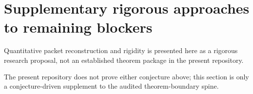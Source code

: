 \section*{Supplementary rigorous approaches to remaining blockers}
Quantitative packet reconstruction and rigidity is presented here as a rigorous research proposal, not an established theorem package in the present repository.

The present repository does not prove either conjecture above; this section is only a conjecture-driven supplement to the audited theorem-boundary spine.
\endinput
